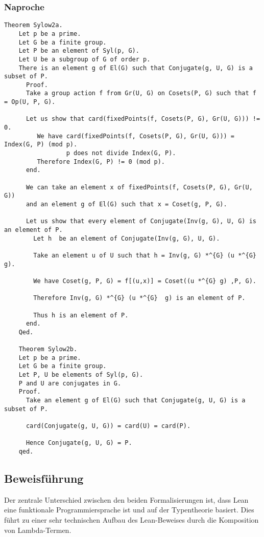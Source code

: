 \documentclass[a4paper,12pt]{scrartcl}
\begin{document}
\subsubsection{Naproche}


\begin{lstlisting}
Theorem Sylow2a.
	Let p be a prime.
	Let G be a finite group.
	Let P be an element of Syl(p, G).
	Let U be a subgroup of G of order p.
	There is an element g of El(G) such that Conjugate(g, U, G) is a subset of P.
	  Proof.
	  Take a group action f from Gr(U, G) on Cosets(P, G) such that f = Op(U, P, G).
	  
	  Let us show that card(fixedPoints(f, Cosets(P, G), Gr(U, G))) !=  0.
		 We have card(fixedPoints(f, Cosets(P, G), Gr(U, G))) = Index(G, P) (mod p).
				 p does not divide Index(G, P).
		 Therefore Index(G, P) != 0 (mod p).
	  end.
	  
	  We can take an element x of fixedPoints(f, Cosets(P, G), Gr(U, G))
	  and an element g of El(G) such that x = Coset(g, P, G).
	  
	  Let us show that every element of Conjugate(Inv(g, G), U, G) is an element of P.
		Let h  be an element of Conjugate(Inv(g, G), U, G).
	
		Take an element u of U such that h = Inv(g, G) *^{G} (u *^{G}  g).
	
		We have Coset(g, P, G) = f[(u,x)] = Coset((u *^{G} g) ,P, G).
	
		Therefore Inv(g, G) *^{G} (u *^{G}  g) is an element of P.
	
		Thus h is an element of P.
	  end.
	Qed.

	Theorem Sylow2b.
	Let p be a prime.
	Let G be a finite group.
	Let P, U be elements of Syl(p, G).
	P and U are conjugates in G.
	Proof.
	  Take an element g of El(G) such that Conjugate(g, U, G) is a subset of P.
	
	  card(Conjugate(g, U, G)) = card(U) = card(P).
	
	  Hence Conjugate(g, U, G) = P.
	qed.
\end{lstlisting}


\subsection{Beweisführung}

Der zentrale Unterschied zwischen den beiden Formalisierungen ist, dass Lean eine funktionale Programmiersprache ist und auf der Typentheorie basiert. Dies führt zu einer sehr technischen Aufbau des Lean-Beweises durch die Komposition von Lambda-Termen.
\end{document}
